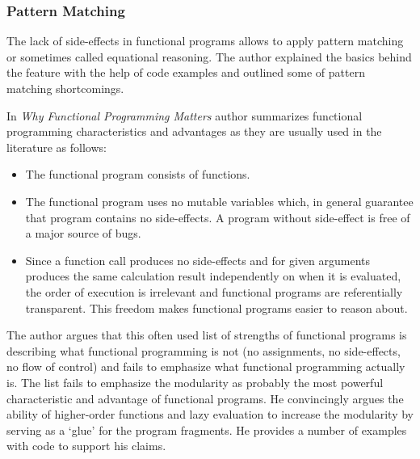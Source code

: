 \documentclass[12pt,twoside,a4paper]{report}
\begin{document}
\subsubsection{Pattern Matching}
The lack of side-effects in functional programs allows to apply pattern matching or sometimes called equational reasoning. The author explained the basics behind the feature with the help of code examples and outlined some of pattern matching shortcomings.\par
In \emph{Why Functional Programming Matters}\cite{14} author summarizes functional programming characteristics and advantages as they are usually used in the literature as follows:
\begin{itemize}\itemsep1pt \parskip0pt 
\item The functional program consists of functions.
\item The functional program uses no mutable variables which, in general guarantee that program contains no side-effects. A program without side-effect is free of a major source of bugs.
\item Since a function call produces no side-effects and for given arguments produces the same calculation result independently on when it is evaluated, the order of execution is irrelevant and functional programs are referentially transparent. This freedom makes functional programs easier to reason about.
\end{itemize}
The author argues that this often used list of strengths of functional programs is describing what functional programming is not (no assignments, no side-effects, no flow of control) and fails to emphasize what functional programming actually is. The list fails to emphasize the modularity as probably the most powerful characteristic and advantage of functional programs. He convincingly argues the ability of higher-order functions and lazy evaluation to increase the modularity by serving as a ‘glue’ for the program fragments. He provides a number of examples with code to support his claims.
\end{document}
